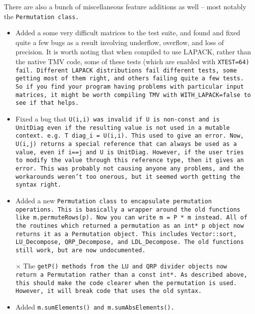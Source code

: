 \begin{description}
There are also a bunch of miscellaneous feature additions as well -- most notably the \tt{Permutation} class.

\begin{itemize}

\item Added a some very difficult matrices to the test suite, and found and fixed quite a few 
bugs as a result involving underflow, overflow, and loss of precision.  It is worth noting that
when compiled to use LAPACK, rather than the native TMV code, some of these tests
(which are enabled with \tt{XTEST=64}) fail.  Different LAPACK distributions fail different tests, some getting most of them right, and others failing quite a few tests.  So if you find your program having problems with particular input matrices, it might be worth compiling TMV with \tt{WITH\_LAPACK=false} to see if that helps.

\item Fixed a bug that \tt{U(i,i)} was invalid if \tt{U} is non-const and is \tt{UnitDiag} even 
if the resulting value is not used in a mutable context.  
e.g. \tt{T diag\_i = U(i,i)}.  This used to give an error.  Now, \tt{U(i,j)} returns a special reference
that can always be used as a value, even if \tt{i==j} and \tt{U} is \tt{UnitDiag}.  
However, if the user tries to modify the value through this reference type, then it gives
an error.  This was probably not causing anyone any problems, and the workarounds 
weren't too onerous, but it seemed worth getting the syntax right.

\item Added a new \tt{Permutation} class to encapsulate permutation operations.  
This is basically a wrapper around the old functions
like \tt{m.permuteRows(p)}.  Now you can write \tt{m = P * m} instead.  All of the routines
which returned a permutation as an \tt{int* p} object now returns it as a \tt{Permutation} object.
This includes \tt{Vector::sort}, \tt{LU\_Decompose}, \tt{QRP\_Decompose}, and 
\tt{LDL\_Decompose}.  The old functions still work, but are now undocumented.

\item[$\times$] The \tt{getP()} methods from the LU and QRP divider objects now return
a \tt{Permutation} rather than a \tt{const int*}.  As described above, this should make the 
code clearer when the permutation is used.  However, it will break code that uses 
the old syntax.

\item Added \tt{m.sumElements()} and \tt{m.sumAbsElements()}.


\end{itemize}
\end{description}
